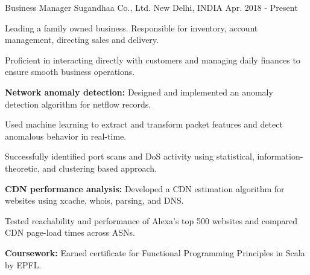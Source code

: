 
\begin{cventries}

  \cventry
    {Business Manager} %
    {Sugandhaa Co., Ltd.} %
    {New Delhi, INDIA} %
    {Apr. 2018 - Present} %
    {
      \begin{cvitems} %
      \item {Leading a family owned business. Responsible for inventory, account management, directing sales and delivery.}
      \item {Proficient in interacting directly with customers and managing daily finances to ensure smooth business operations.}
%      
      \item {\textbf{Network anomaly detection:} Designed and implemented an anomaly detection algorithm for netflow records.
      		}
      \item {Used machine learning to extract and transform packet features and detect anomalous behavior in real-time.}
      \item {Successfully identified port scans and DoS activity using statistical, information-theoretic, and clustering based approach.}
%      
      \item {\textbf{CDN performance analysis:} Developed a CDN estimation algorithm for websites using xcache, whois, parsing, and DNS.
      		}
      \item {Tested reachability and performance of Alexa's top 500 websites and compared CDN page-load times across ASNs.}
%      
      \item {\textbf{Coursework:} Earned certificate for Functional Programming Principles in Scala by EPFL.
      		}

\end{cvitems}}
\end{cventries}
